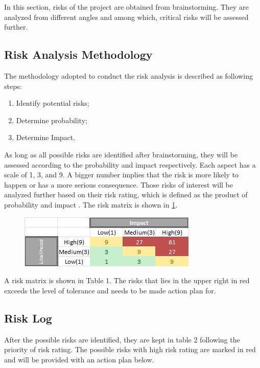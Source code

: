 

In this section, risks of the project are obtained from brainstorming. They are analyzed from different angles and among which, critical risks will be assessed further.   
\subsection{Risk Analysis Methodology}
The methodology adopted to conduct the risk analysis is described as following steps:  
\begin{enumerate}[itemsep=0pt, topsep=3pt, partopsep=3pt]
  \item Identify potential risks;
  \item Determine probability;
  \item Determine Impact.
\end{enumerate}

As long as all possible risks are identified after brainstorming, they will be assessed according to the probability and impact respectively. Each aspect has a scale of 1, 3, and 9. A bigger number implies that the risk is more likely to happen or has a more serious consequence. Those risks of interest will be analyzed further based on their risk rating, which is defined as the product of probability and impact \cite{Risk}. The risk matrix is shown in \ref{fig:riskmatrix}.  


\begin{figure}[h!]
\centering
\includegraphics[scale=1.0]{Pictures/riskmatrix.png}
\label{fig:riskmatrix}
\end{figure}

A risk matrix is shown in Table 1. The risks that lies in the upper right in red exceeds the level of tolerance and needs to be made action plan for. 
\subsection{Risk Log}
After the possible risks are identified, they are kept in table 2 following the priority of risk rating. The possible risks with high risk rating are marked in red and will be provided with an action plan below. 


